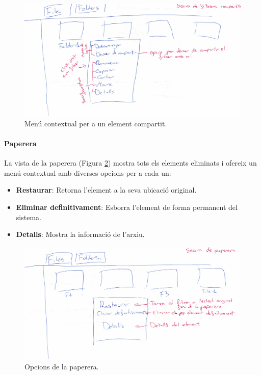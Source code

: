 \begin{figure}[H]
    \centering
    \includegraphics[width=\textwidth]{Figures/interficies/react-opcions-compartir.jpg}
    \caption{Menú contextual per a un element compartit.}
    \label{fig:react-opcions-compartir}
\end{figure}

\paragraph{Paperera}
La vista de la paperera (Figura \ref{fig:react-opcions-paperera}) mostra tots els elements eliminats i ofereix un menú contextual amb diverses opcions per a cada un:
\begin{itemize}
    \item \textbf{Restaurar}: Retorna l'element a la seva ubicació original.
    \item \textbf{Eliminar definitivament}: Esborra l'element de forma permanent del sistema.
    \item \textbf{Detalls}: Mostra la informació de l'arxiu.
\end{itemize}

\begin{figure}[H]
    \centering
    \includegraphics[width=\textwidth]{Figures/interficies/react-opcions-paperera.jpg}
    \caption{Opcions de la paperera.}
    \label{fig:react-opcions-paperera}
\end{figure}

